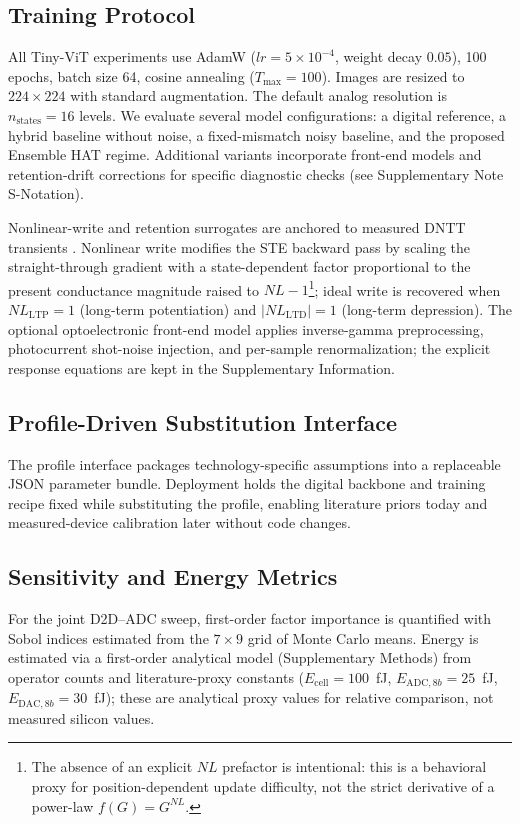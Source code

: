 \subsection{Training Protocol}
\label{subsec:training-protocol}

All Tiny-ViT experiments use AdamW ($lr = 5\times10^{-4}$, weight decay $0.05$), 100 epochs, batch size 64, cosine annealing ($T_{\max}=100$). Images are resized to $224\times224$ with standard augmentation. The default analog resolution is $n_{\mathrm{states}}=16$ levels. We evaluate several model configurations: a digital reference, a hybrid baseline without noise, a fixed-mismatch noisy baseline, and the proposed Ensemble HAT regime. Additional variants incorporate front-end models and retention-drift corrections for specific diagnostic checks (see Supplementary Note S-Notation).

Nonlinear-write and retention surrogates are anchored to measured DNTT transients \citep{vincze2025dualplasticity}. Nonlinear write modifies the STE backward pass by scaling the straight-through gradient with a state-dependent factor proportional to the present conductance magnitude raised to $NL-1$\footnote{The absence of an explicit $NL$ prefactor is intentional: this is a behavioral proxy for position-dependent update difficulty, not the strict derivative of a power-law $f(G)=G^{NL}$.}; ideal write is recovered when $NL_{\mathrm{LTP}}=1$ (long-term potentiation) and $|NL_{\mathrm{LTD}}|=1$ (long-term depression). The optional optoelectronic front-end model applies inverse-gamma preprocessing, photocurrent shot-noise injection, and per-sample renormalization; the explicit response equations are kept in the Supplementary Information.

\subsection{Profile-Driven Substitution Interface}
\label{subsec:profile-interface}

The profile interface packages technology-specific assumptions into a replaceable JSON parameter bundle. Deployment holds the digital backbone and training recipe fixed while substituting the profile, enabling literature priors today and measured-device calibration later without code changes.

\subsection{Sensitivity and Energy Metrics}
\label{subsec:sensitivity-energy}

For the joint D2D--ADC sweep, first-order factor importance is quantified with Sobol indices estimated from the $7 \times 9$ grid of Monte Carlo means. Energy is estimated via a first-order analytical model (Supplementary Methods) from operator counts and literature-proxy constants ($E_{\text{cell}}=100$~fJ, $E_{\text{ADC},8b}=25$~fJ, $E_{\text{DAC},8b}=30$~fJ); these are analytical proxy values for relative comparison, not measured silicon values.
